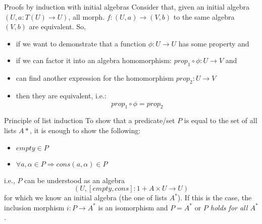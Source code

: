 \documentclass[presentation]{beamer}
\begin{document}
\begin{frame}[label={sec:orge21875e}]{Proofs by induction with initial algebras}
Consider that, given an initial algebra \((U, a: T(U) \rightarrow U)\), all
morph. \(f: (U,a) \rightarrow (V,b)\) to the same algebra \((V,b)\) are
equivalent. So,

\begin{itemize}
\item if we want to demonstrate that a function \(\phi: U \rightarrow U\) has
some property and
\item if we can factor it into an algebra homomorphism:
\(prop_1 \circ \phi: U \rightarrow V\) and
\item can find another expression for
the homomorphism \(prop_2: U \rightarrow V\)
\item then they are equivalent, i.e.:
$$prop_1 \circ \phi = prop_2$$
\end{itemize}
\end{frame}

\begin{frame}[label={sec:orgfe10041}]{Principle of list induction}
To show that a predicate/set \(P\) is equal to the set of all lists \(A*\), it is enough to
show the following:

\begin{itemize}
\item \(empty \in P\)
\item \(\forall a, \alpha \in P \Rightarrow cons(a,\alpha) \in P\)
\end{itemize}

i.e., \(P\) can be understood as an algebra $$(U, [empty,cons]: 1 + A\times U
    \rightarrow U)$$ for which we know an initial algebra (the one of lists
\(A^*\)). If this is the case, the inclusion morphism \(i: P \rightarrow A^*\) is
an isomorphism and \(P = A^*\) or \emph{\(P\) holds for all \(A^*\)}.
\end{frame}
\end{document}

